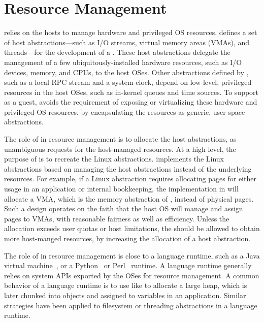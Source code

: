 \section{Resource Management}
\label{sec:libos:resource}


\Thelibos{}
relies on the hosts to manage hardware and privileged OS resources.
\Thehostabi{}
defines a set of host abstractions---such as I/O streams, virtual memory areas (VMAs), and threads---for the development of a \libos{}.
These host abstractions delegate
the management of a few ubiquitously-installed hardware resources, such as I/O devices, memory, and CPUs,
to the host OSes.
Other abstractions defined
by \thehostabi{},
such as a local RPC stream and a system clock,
depend on low-level, privileged resources in the host OSes,
such as in-kernel queues and time sources.
To support \thelibos{} as a guest,
\thehostabi{} avoids the requirement of exposing or virtualizing %
these hardware and privileged OS resources,
by encapsulating the resources as generic, user-space abstractions.



The role of \thelibos{} in resource management
is to allocate the host abstractions,
as unambiguous requests %
for the host-managed resources.
At a high level, the purpose of \thelibos{} is to recreate the Linux abstractions.
\Thelibos{} implements the Linux abstractions
based on managing the host abstractions instead of
the underlying resources.
For example, if a Linux abstraction requires allocating pages
for either usage in an application or
internal bookkeeping,
the implementation in
\thelibos{} will allocate a VMA, which is the memory abstraction of \thehostabi{}, instead of physical pages.
Such a \libos{} design operates on the faith that the host OS will manage and assign pages to VMAs, with reasonable fairness as well as efficiency.
Unless the allocation exceeds user quotas or host limitations,
the \libos{} should be allowed to obtain more host-manged resources,
by increasing the allocation of a host abstraction.



The role of \thelibos{} in resource management is close to a language runtime, such as a Java virtual machine~\cite{hotspot,j9,alpern2000jalapeno}, or a Python~\cite{python} or Perl~\cite{perl} runtime.
A language runtime generally relies on system APIs exported by the OSes
for resource management.
A common behavior of a language runtime
is to use \linuxapis{} like  to allocate a large heap,
which is later chunked into objects
and assigned to variables in an application.
Similar strategies have been applied to
filesystem or threading abstractions in a language runtime. %




